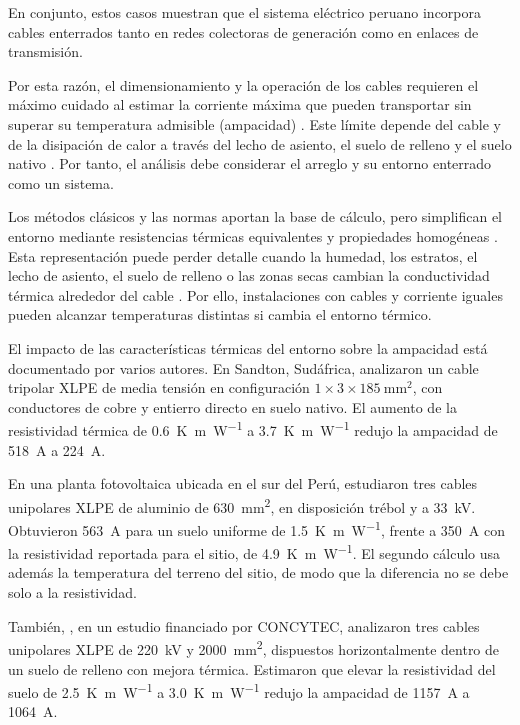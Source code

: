 En conjunto, estos casos muestran que el sistema eléctrico peruano incorpora cables enterrados tanto en redes colectoras de generación como en enlaces de transmisión. 

Por esta razón, el dimensionamiento y la operación de los cables requieren el máximo cuidado al estimar la corriente máxima que pueden transportar sin superar su temperatura admisible (ampacidad) \parencite{iec60287}. Este límite depende del cable y de la disipación de calor a través del lecho de asiento, el suelo de relleno y el suelo nativo \parencites{fariz2026}{mobius2025}. Por tanto, el análisis debe considerar el arreglo y su entorno enterrado como un sistema.

Los métodos clásicos y las normas aportan la base de cálculo, pero simplifican el entorno mediante resistencias térmicas equivalentes y propiedades homogéneas \parencites[752--760]{neher1957}{iec60287}{iec60853}. Esta representación puede perder detalle cuando la humedad, los estratos, el lecho de asiento, el suelo de relleno o las zonas secas cambian la conductividad térmica alrededor del cable \parencites[4--6]{enescu2021}[1--3]{aldulaimi2024}. Por ello, instalaciones con cables y corriente iguales pueden alcanzar temperaturas distintas si cambia el entorno térmico.

El impacto de las características térmicas del entorno sobre la ampacidad está documentado por varios autores. En Sandton, Sudáfrica, \textcite[5--6, tabs.~2--3]{khumalo2025} analizaron un cable tripolar XLPE de media tensión en configuración $1\times3\times\SI{185}{\milli\metre\squared}$, con conductores de cobre y entierro directo en suelo nativo. El aumento de la resistividad térmica de \SI{0.6}{\kelvin\metre\per\watt} a \SI{3.7}{\kelvin\metre\per\watt} redujo la ampacidad de \SI{518}{\ampere} a \SI{224}{\ampere}.

En una planta fotovoltaica ubicada en el sur del Perú, \textcite[7--8]{ariasVelasquez2023} estudiaron tres cables unipolares XLPE de aluminio de \SI{630}{\milli\metre\squared}, en disposición trébol y a \SI{33}{\kilo\volt}. Obtuvieron \SI{563}{\ampere} para un suelo uniforme de \SI{1.5}{\kelvin\metre\per\watt}, frente a \SI{350}{\ampere} con la resistividad reportada para el sitio, de \SI{4.9}{\kelvin\metre\per\watt}. El segundo cálculo usa además la temperatura del terreno del sitio, de modo que la diferencia no se debe solo a la resistividad.

También, \textcite[15--16]{atoccsa2024}, en un estudio financiado por CONCYTEC, analizaron tres cables unipolares XLPE de \SI{220}{\kilo\volt} y \SI{2000}{\milli\metre\squared}, dispuestos horizontalmente dentro de un suelo de relleno con mejora térmica. Estimaron que elevar la resistividad del suelo de \SI{2.5}{\kelvin\metre\per\watt} a \SI{3.0}{\kelvin\metre\per\watt} redujo la ampacidad de \SI{1157}{\ampere} a \SI{1064}{\ampere}.


